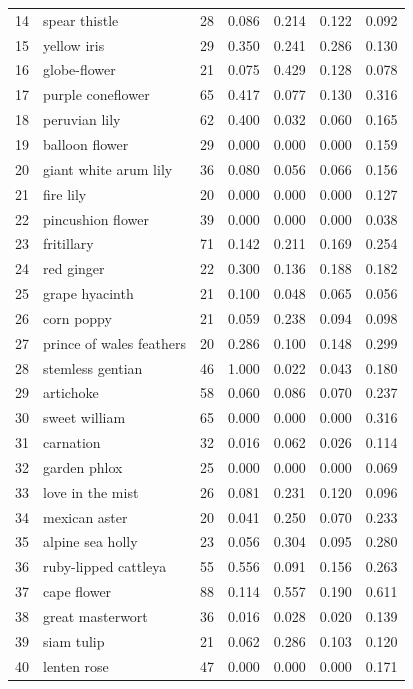 \begin{longtable}{r l r r r r r}
14 & spear thistle & 28 & 0.086 & 0.214 & 0.122 & 0.092 \\
15 & yellow iris & 29 & 0.350 & 0.241 & 0.286 & 0.130 \\
16 & globe-flower & 21 & 0.075 & 0.429 & 0.128 & 0.078 \\
17 & purple coneflower & 65 & 0.417 & 0.077 & 0.130 & 0.316 \\
18 & peruvian lily & 62 & 0.400 & 0.032 & 0.060 & 0.165 \\
19 & balloon flower & 29 & 0.000 & 0.000 & 0.000 & 0.159 \\
20 & giant white arum lily & 36 & 0.080 & 0.056 & 0.066 & 0.156 \\
21 & fire lily & 20 & 0.000 & 0.000 & 0.000 & 0.127 \\
22 & pincushion flower & 39 & 0.000 & 0.000 & 0.000 & 0.038 \\
23 & fritillary & 71 & 0.142 & 0.211 & 0.169 & 0.254 \\
24 & red ginger & 22 & 0.300 & 0.136 & 0.188 & 0.182 \\
25 & grape hyacinth & 21 & 0.100 & 0.048 & 0.065 & 0.056 \\
26 & corn poppy & 21 & 0.059 & 0.238 & 0.094 & 0.098 \\
27 & prince of wales feathers & 20 & 0.286 & 0.100 & 0.148 & 0.299 \\
28 & stemless gentian & 46 & 1.000 & 0.022 & 0.043 & 0.180 \\
29 & artichoke & 58 & 0.060 & 0.086 & 0.070 & 0.237 \\
30 & sweet william & 65 & 0.000 & 0.000 & 0.000 & 0.316 \\
31 & carnation & 32 & 0.016 & 0.062 & 0.026 & 0.114 \\
32 & garden phlox & 25 & 0.000 & 0.000 & 0.000 & 0.069 \\
33 & love in the mist & 26 & 0.081 & 0.231 & 0.120 & 0.096 \\
34 & mexican aster & 20 & 0.041 & 0.250 & 0.070 & 0.233 \\
35 & alpine sea holly & 23 & 0.056 & 0.304 & 0.095 & 0.280 \\
36 & ruby-lipped cattleya & 55 & 0.556 & 0.091 & 0.156 & 0.263 \\
37 & cape flower & 88 & 0.114 & 0.557 & 0.190 & 0.611 \\
38 & great masterwort & 36 & 0.016 & 0.028 & 0.020 & 0.139 \\
39 & siam tulip & 21 & 0.062 & 0.286 & 0.103 & 0.120 \\
40 & lenten rose & 47 & 0.000 & 0.000 & 0.000 & 0.171 \\

\end{longtable}
